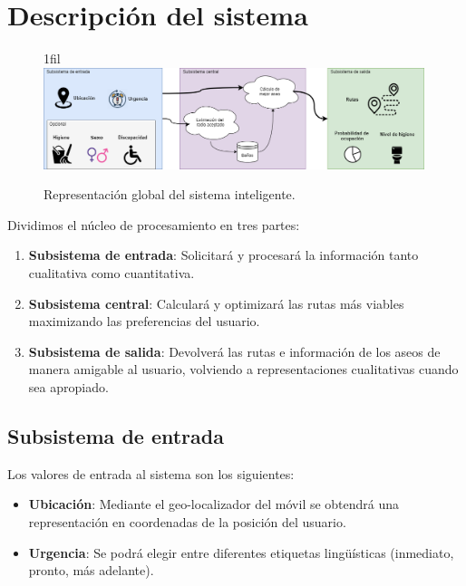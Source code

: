 \documentclass[13pt,a4paper]{article}
\makeatletter
\newcommand*{\centerfloat}{%
  \parindent \z@
  \leftskip \z@ \@plus 1fil \@minus \textwidth
  \rightskip\leftskip
  \parfillskip \z@skip}
\makeatother
\begin{document}
\section{Descripción del sistema}

\begin{figure}[H]
  \centerfloat
  \includegraphics[width=0.99\textwidth]{img/0.png}
  \caption{Representación global del sistema inteligente.}
\end{figure}

Dividimos el núcleo de procesamiento en tres partes:
\begin{enumerate}
  \item \textbf{Subsistema de entrada}: Solicitará y procesará la información tanto cualitativa como cuantitativa.
  \item \textbf{Subsistema central}: Calculará y optimizará las rutas más viables maximizando las preferencias del usuario.
  \item \textbf{Subsistema de salida}: Devolverá las rutas e información de los aseos de manera amigable al usuario, volviendo a representaciones cualitativas cuando sea apropiado.
\end{enumerate}

\subsection{Subsistema de entrada}

Los valores de entrada al sistema son los siguientes:
\begin{itemize}
  \item \textbf{Ubicación}: Mediante el geo-localizador del móvil se obtendrá una representación en coordenadas de la posición del usuario.
  \item \textbf{Urgencia}: Se podrá elegir entre diferentes etiquetas lingüísticas (inmediato, pronto, más adelante). 
\end{itemize}
\end{document}
